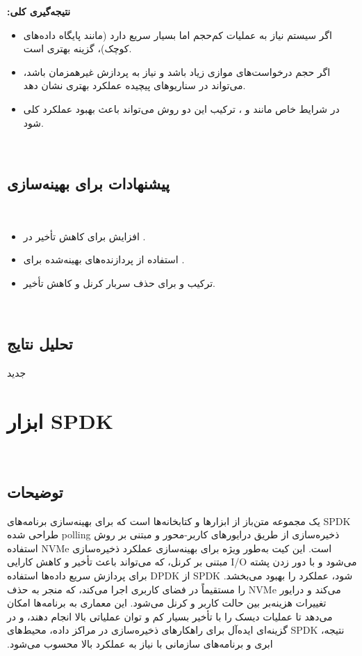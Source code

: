 ‫
‫\textbf{نتیجه‌گیری کلی:}
‫\begin{itemize}
‫	\item اگر سیستم نیاز به عملیات  کم‌حجم اما بسیار سریع دارد (مانند پایگاه داده‌های کوچک)،  گزینه بهتری است.
‫	\item اگر حجم درخواست‌های موازی زیاد باشد و نیاز به پردازش غیرهمزمان باشد،  می‌تواند در سناریوهای پیچیده عملکرد بهتری نشان دهد.
‫	\item در شرایط خاص مانند  و ، ترکیب این دو روش می‌تواند باعث بهبود عملکرد کلی شود.
‫\end{itemize}
‫
‫\subsection*{پیشنهادات برای بهینه‌سازی}
‫\begin{itemize}
‫	\item افزایش  برای کاهش تأخیر در .
‫	\item استفاده از پردازنده‌های بهینه‌شده برای .
‫	\item ترکیب  و  برای حذف سربار کرنل و کاهش تأخیر.
‫\end{itemize}
‫
‫‫\subsection*{تحلیل نتایج}
‫
‫‌جدید
‫
‫‫\section{ابزار SPDK}
‫
‫‫\subsection*{توضیحات}
‫
‫SPDK یک مجموعه متن‌باز از ابزارها و کتابخانه‌ها است که برای بهینه‌سازی برنامه‌های ذخیره‌سازی از طریق درایورهای کاربر-محور و مبتنی بر روش polling طراحی شده است. این کیت به‌طور ویژه برای بهینه‌سازی عملکرد ذخیره‌سازی NVMe استفاده می‌شود و با دور زدن پشته I/O مبتنی بر کرنل، که می‌تواند باعث تأخیر و کاهش کارایی شود، عملکرد را بهبود می‌بخشد. SPDK از DPDK برای پردازش سریع داده‌ها استفاده می‌کند و درایور NVMe را مستقیماً در فضای کاربری اجرا می‌کند، که منجر به حذف تغییرات هزینه‌بر بین حالت کاربر و کرنل می‌شود. این معماری به برنامه‌ها امکان می‌دهد تا عملیات دیسک را با تأخیر بسیار کم و توان عملیاتی بالا انجام دهند، و در نتیجه، SPDK گزینه‌ای ایده‌آل برای راهکارهای ذخیره‌سازی در مراکز داده، محیط‌های ابری و برنامه‌های سازمانی با نیاز به عملکرد بالا محسوب می‌شود.
